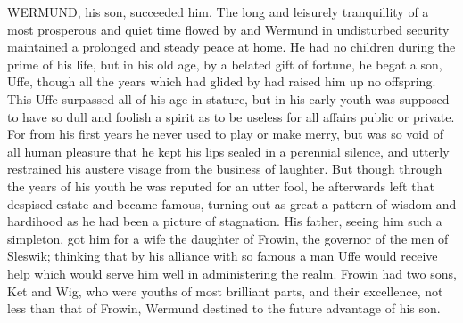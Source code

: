 \documentclass[10pt,a4paper]{report}
\begin{document}
WERMUND, his son, succeeded him. The long and leisurely tranquillity of a most prosperous and quiet time flowed by and Wermund in undisturbed security maintained a prolonged and steady peace at home. He had no children during the prime of his life, but in his old age, by a belated gift of fortune, he begat a son, Uffe, though all the years which had glided by had raised him up no offspring. This Uffe surpassed all of his age in stature, but in his early youth was supposed to have so dull and foolish a spirit as to be useless for all affairs public or private. For from his first years he never used to play or make merry, but was so void of all human pleasure that he kept his lips sealed in a perennial silence, and utterly restrained his austere visage from the business of laughter. But though through the years of his youth he was reputed for an utter fool, he afterwards left that despised estate and became famous, turning out as great a pattern of wisdom and hardihood as he had been a picture of stagnation. His father, seeing him such a simpleton, got him for a wife the daughter of Frowin, the governor of the men of Sleswik; thinking that by his alliance with so famous a man Uffe would receive help which would serve him well in administering the realm. Frowin had two sons, Ket and Wig, who were youths of most brilliant parts, and their excellence, not less than that of Frowin, Wermund destined to the future advantage of his son.\\
\end{document}
